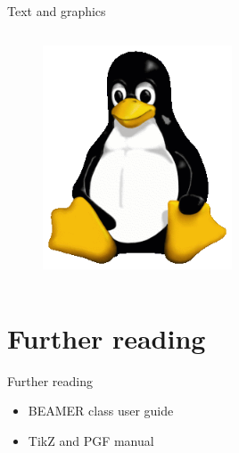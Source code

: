 \documentclass[11pt,t]{beamer}
\begin{document}
\begin{frame}[t]{Text and graphics}
\begin{columns}
\begin{column}{.2\textwidth}
\begin{figure}
				\vspace{4mm}
				\includegraphics[width=0.5\textwidth]{Tux}\\				
			\end{figure}
		\end{column}
	\end{columns}
\end{frame}
\section{Further reading}
\begin{frame}[t]{Further reading}
	\begin{itemize}
		\item BEAMER class user guide
		\item TikZ and PGF manual
	\end{itemize}
\end{frame}
\end{document}

